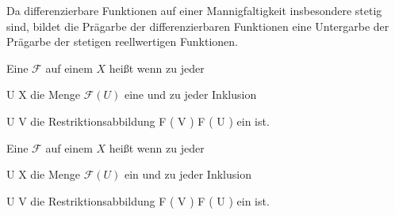 Da differenzierbare Funktionen auf einer Mannigfaltigkeit insbesondere stetig sind, bildet die Prägarbe der differenzierbaren Funktionen eine Untergarbe der Prägarbe der stetigen reellwertigen Funktionen.







{}
{





Eine
${ \mathcal  F   }$ auf einem
$X$ heißt
wenn zu jeder

\mavergleichskette
{\vergleichskette
{U
}
{ \subseteq }{ X
}
{  }{
}
{    }{
}
{   }{
}
}
{}{}{}
die Menge ${ \mathcal  F   }  \left(   U   \right)$ eine
und zu jeder Inklusion

\mavergleichskette
{\vergleichskette
{U
}
{ \subseteq }{ V
}
{  }{
}
{    }{
}
{   }{
}
}
{}{}{}
die Restriktionsabbildung
 { { \mathcal  F   }  \left(   V   \right) } { { \mathcal  F   }  \left(   U   \right)
} {}
ein
ist.





}


{}
{





Eine
${ \mathcal  F   }$ auf einem
$X$ heißt
wenn zu jeder

\mavergleichskette
{\vergleichskette
{U
}
{ \subseteq }{ X
}
{  }{
}
{    }{
}
{   }{
}
}
{}{}{}
die Menge ${ \mathcal  F   }  \left(   U   \right)$ ein
und zu jeder Inklusion

\mavergleichskette
{\vergleichskette
{U
}
{ \subseteq }{ V
}
{  }{
}
{    }{
}
{   }{
}
}
{}{}{}
die Restriktionsabbildung
 { { \mathcal  F   }  \left(   V   \right) } { { \mathcal  F   }  \left(   U   \right)
} {}
ein
ist.





}

